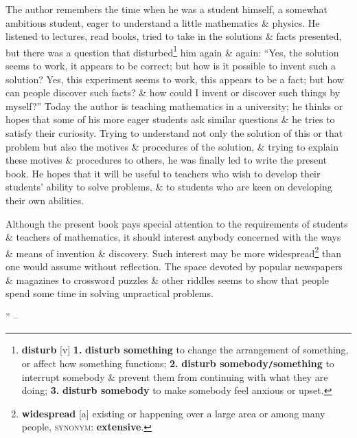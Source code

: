 \documentclass[oneside]{book}
\numberwithin{equation}{section}
\begin{document}
The author remembers the time when he was a student himself, a somewhat ambitious student, eager to understand a little mathematics \& physics. He listened to lectures, read books, tried to take in the solutions \& facts presented, but there was a question that disturbed\footnote{\textbf{disturb} [v] \textbf{1.} \textbf{disturb something} to change the arrangement of something, or affect how something functions; \textbf{2.} \textbf{disturb somebody\texttt{/}something} to interrupt somebody \& prevent them from continuing with what they are doing; \textbf{3.} \textbf{disturb somebody} to make somebody feel anxious or upset.} him again \& again: ``Yes, the solution seems to work, it appears to be correct; but how is it possible to invent such a solution? Yes, this experiment seems to work, this appears to be a fact; but how can people discover such facts? \& how could I invent or discover such things by myself?'' Today the author is teaching mathematics in a university; he thinks or hopes that some of his more eager students ask similar questions \& he tries to satisfy their curiosity. Trying to understand not only the solution of this or that problem but also the motives \& procedures of the solution, \& trying to explain these motives \& procedures to others, he was finally led to write the present book. He hopes that it will be useful to teachers who wish to develop their students' ability to solve problems, \& to students who are keen on developing their own abilities.

Although the present book pays special attention to the requirements of students \& teachers of mathematics, it should interest anybody concerned with the ways \& means of invention \& discovery. Such interest may be more widespread\footnote{\textbf{widespread} [a] existing or happening over a large area or among many people, \textsc{synonym}: \textbf{extensive}.} than one would assume without reflection. The space devoted by popular newspapers \& magazines to crossword puzzles \& other riddles seems to show that people spend some time in solving unpractical problems.

'' -- \cite[pp. v--]{Polya2014}




\printbibliography[heading=bibintoc]
	
\end{document}
